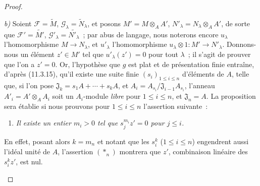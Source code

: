 \begin{proof}
\begin{enumerate}[label=(\roman*)]
  \emph{b)} Soient $\mathcal F=\widetilde M$,
  $\mathcal G_\lambda=\widetilde N_\lambda$, et posons
  $M'=M\otimes_A A'$, $N'_\lambda=N_\lambda\otimes_A A'$, de sorte que
  $\mathcal F'=\widetilde{M'}$, $\mathcal G'_\lambda=\widetilde{N'_\lambda}$~;
  par abus de langage, nous noterons encore $u_\lambda$ l'homomorphisme
  $M\to N_\lambda$, et $u'_\lambda$ l'homomorphisme
  $u_\lambda\otimes 1:M'\to N'_\lambda$. Donnons-nous un élément $z'\in M'$
  tel que $u'_\lambda(z')=0$ pour tout $\lambda$~; il s'agit de prouver que
  l'on a $z'=0$. Or, l'hypothèse que $g$ est plat et de présentation finie
  entraîne, d'après (11.3.15), qu'il existe une suite finie
  $(s_i)_{1\leq i\leq n}$ d'éléments de $A$, telle que, si l'on pose
  $\mathfrak J_k=s_1A+\cdots+s_kA$, et
  $A_i=A_{s_i}/\mathfrak J_{i-1}A_{s_i}$, l'anneau
  $A'_i=A'\otimes_A A_i$ soit un $A_i$-module \emph{libre} pour
  $1\leq i\leq n$, et $\mathfrak J_n=A$. La proposition sera établie si nous
  prouvons pour $1\leq i\leq n$ l'assertion suivante~:
  \begin{enumerate}[label=$(*_i)$]
    \item \emph{Il existe un entier $m_i>0$ tel que $s_j^{m_i}z'=0$ pour
    $j\leq i$.}
  \end{enumerate}
  En effet, posant alors $k=m_n$ et notant que les $s_i^k$ ($1\leq i\leq n$)
  engendrent aussi l'idéal unité de $A$, l'assertion $(*_n)$ montrera que $z'$,
  combinaison linéaire des $s_i^kz'$, est nul.


\end{enumerate}
\end{proof}
